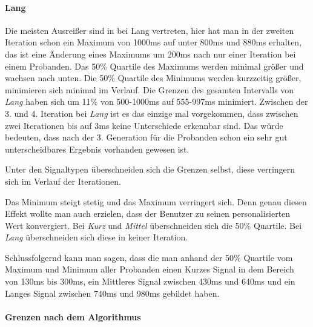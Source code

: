 \paragraph{Lang}
Die meisten Ausrei{\ss}er sind in bei Lang vertreten, hier hat man in der zweiten Iteration schon ein Maximum von 1000ms auf unter 800ms und 880ms erhalten, das ist eine {\"A}nderung eines Maximums um 200ms nach nur einer Iteration bei einem Probanden.
Das 50\% Quartile des Maximums werden minimal gr{\"o}{\ss}er und wachsen nach unten.
Die 50\% Quartile des Minimums werden kurzzeitig gr{\"o}{\ss}er, minimieren sich minimal im Verlauf.
Die Grenzen des gesamten Intervalls von \textit{Lang} haben sich um 11\% von 500-1000ms auf 555-997ms minimiert.
Zwischen der 3. und 4. Iteration bei \textit{Lang} ist es das einzige mal vorgekommen, dass zwischen zwei Iterationen bis auf 3ms keine Unterschiede erkennbar sind.
Das w{\"u}rde bedeuten, dass nach der 3. Generation f{\"u}r die Probanden schon ein sehr gut unterscheidbares Ergebnis vorhanden gewesen ist.


Unter den Signaltypen {\"u}berschneiden sich die Grenzen selbst, diese verringern sich im Verlauf der Iterationen.

Das Minimum steigt stetig und das Maximum verringert sich. 
Denn genau diesen Effekt wollte man auch erzielen, dass der Benutzer zu seinen personalisierten Wert konvergiert.
Bei \textit{Kurz} und \textit{Mittel} {\"u}berschneiden sich die 50\% Quartile. 
Bei \textit{Lang} {\"u}berschneiden sich diese in keiner Iteration.

Schlussfolgernd kann man sagen, dass die man anhand der 50\% Quartile vom Maximum und Minimum aller Probanden einen Kurzes Signal in dem Bereich von 130ms bis 300ms, ein Mittleres Signal zwischen 430ms und 640ms und ein Langes Signal zwischen 740ms und 980ms gebildet haben. 




\paragraph{Grenzen nach dem Algorithmus}

